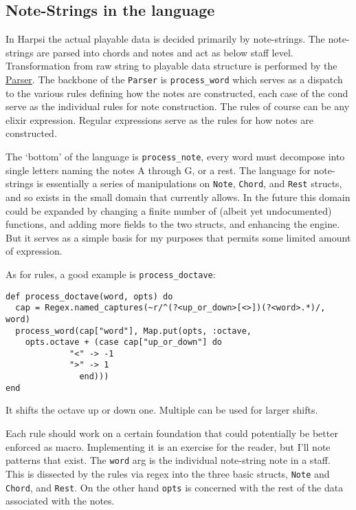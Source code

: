 \documentclass[11pt]{article}
\begin{document}
\subsection{Note-Strings in the language}
\label{sec-3-1}
In Harpsi the actual playable data is decided primarily by
note-strings. The note-strings are parsed into chords and notes and
act as below staff level. Transformation from raw string to
playable data structure is performed by the \href{lib/parser.ex}{Parser}. The
backbone of the \texttt{Parser} is \texttt{process\_word} which serves as a
dispatch to the various rules defining how the notes are
constructed, each case of the cond serve as the individual rules
for note construction. The rules of course can be any elixir
expression. Regular expressions serve as the rules for how notes
are constructed.

The `bottom' of the language is \texttt{process\_note}, every word must
decompose into single letters naming the notes A through G, or a
rest. The language for note-strings is essentially a series of
manipulations on \texttt{Note}, \texttt{Chord}, and \texttt{Rest} structs, and so exists in the
small domain that currently allows. In the future this domain could
be expanded by changing a finite number of (albeit yet
undocumented) functions, and adding more fields to the two structs,
and enhancing the engine. But it serves as a simple basis for my
purposes that permits some limited amount of expression.

As for rules, a good example is \texttt{process\_doctave}:
\begin{verbatim}
def process_doctave(word, opts) do
  cap = Regex.named_captures(~r/^(?<up_or_down>[<>])(?<word>.*)/, word)
  process_word(cap["word"], Map.put(opts, :octave,
	opts.octave + (case cap["up_or_down"] do
			 "<" -> -1
			 ">" -> 1
		       end)))
end
\end{verbatim}
It shifts the octave up or down one. Multiple can be used for
larger shifts.

Each rule should work on a certain foundation that could
potentially be better enforced as macro. Implementing it is an
exercise for the reader, but I'll note patterns that exist. The
\texttt{word} arg is the individual note-string note in a staff. This is
dissected by the rules via regex into the three basic structs,
\texttt{Note} and \texttt{Chord}, and \texttt{Rest}. On the other hand \texttt{opts} is
concerned with the rest of the data associated with the notes.
\end{document}

